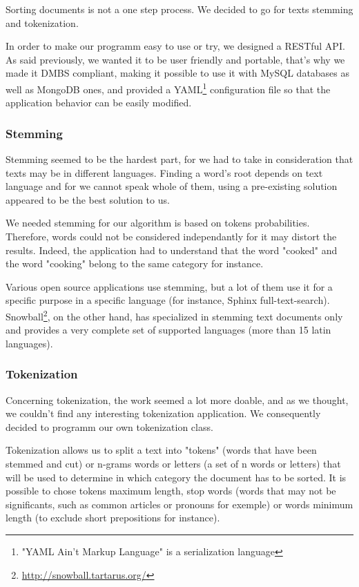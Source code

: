 \documentclass[a4paper,11pt]{article}
\begin{document}
Sorting documents is not a one step process. We decided to go for texts
stemming and tokenization.

In order to make our programm easy to use or try, we designed a RESTful API.
As said previously, we wanted it to be user friendly and portable, that's why
we made it DMBS compliant, making it possible to use it with MySQL databases
as well as MongoDB ones, and provided a YAML\footnote{"YAML Ain't Markup
Language" is a serialization language}
configuration file so that the application behavior can be easily modified.

\subsubsection{Stemming}

Stemming seemed to be the hardest part, for we had to take in consideration
that texts may be in different languages. Finding a word's root depends on
text language and for we cannot speak whole of them, using a pre-existing
solution appeared to be the best solution to us.

We needed stemming for our algorithm is based on tokens probabilities.
Therefore, words could not be considered independantly for it may distort
the results. Indeed, the application had to understand that the word "cooked"
and the word "cooking" belong to the same category for instance.

Various open source applications use stemming, but a lot of them use it for
a specific purpose in a specific language (for instance, Sphinx
full-text-search). Snowball\footnote{\url{http://snowball.tartarus.org/}},
on the other hand, has specialized in
stemming text documents only and provides a very complete set of supported
languages (more than 15 latin languages).

\subsubsection{Tokenization}

Concerning tokenization, the work seemed a lot more doable, and as we
thought, we couldn't find any interesting tokenization application. We
consequently decided to programm our own tokenization class.

Tokenization allows us to split a text into "tokens" (words that have
been stemmed and cut) or n-grams words or letters (a set of n words or
letters) that will be used to determine in which category the document has to
 be sorted. It is possible to chose tokens maximum length, stop words (words
that may not be significants, such as common articles or pronouns for
exemple) or words minimum length (to exclude short prepositions for
instance).
\end{document}
